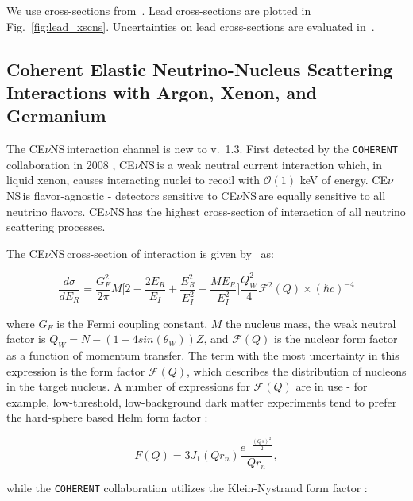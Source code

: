 \documentclass{article}
\newcommand{\cev}{CE$\nu$NS\,}
\begin{document}
We use cross-sections from~\cite{Engel:2002hg}. Lead cross-sections are plotted in Fig.~\ref{fig:lead_xscns}. Uncertainties on lead cross-sections are evaluated in~\cite{Paar:2011pz}.

\subsection{Coherent Elastic Neutrino-Nucleus Scattering Interactions with Argon, Xenon, and Germanium} \label{subsec:cevxsec}

The \cev interaction channel is new to v.~1.3. First detected by the \texttt{COHERENT} collaboration in 2008 \cite{AGUILARAREVALO200841}, \cev is a weak neutral current interaction which, in liquid xenon, causes interacting nuclei to recoil with $\mathcal{O}(1)$ keV of energy. \cev is flavor-agnostic - detectors sensitive to \cev are equally sensitive to all neutrino flavors. \cev has the highest cross-section of interaction of all neutrino scattering processes.

The \cev cross-section of interaction is given by~\cite{patton_neutrino-nucleus_2012} as:

\begin{equation} \label{eq:dsigma}
    \frac{d\sigma}{dE_R} = \frac{G_F^2}{2 \pi} M \bigg[ 2 - \frac{2E_R}{E_I} + \frac{E_R^2}{E_I^2} - \frac{M E_R}{E_I^2} \bigg] \frac{Q_W^2}{4} \mathcal{F}^2(Q) \times (\hbar c)^{-4}
\end{equation}

\noindent where $G_F$ is the Fermi coupling constant, $M$ the nucleus mass, the weak neutral factor is $Q_W = N - (1-4sin(\theta_W))Z$, and $\mathcal{F}(Q)$ is the nuclear form factor as a function of momentum transfer. The term with the most uncertainty in this expression is the form factor $\mathcal{F}(Q)$, which describes the distribution of nucleons in the target nucleus. A number of expressions for $\mathcal{F}(Q)$ are in use - for example, low-threshold, low-background dark matter experiments tend to prefer the hard-sphere based Helm form factor \cite{lewin_review_1996, akerib_lux-zeplin_2020}:

\begin{equation}
    F(Q) = 3 J_1(Q r_n) \frac{e^{-\frac{(Qs)^2}{2}}}{Q r_n},
    \label{eqn:helmform}
\end{equation}

\noindent while the \texttt{COHERENT} collaboration utilizes the Klein-Nystrand form factor \cite{klein_exclusive_1999}:
\end{document}

